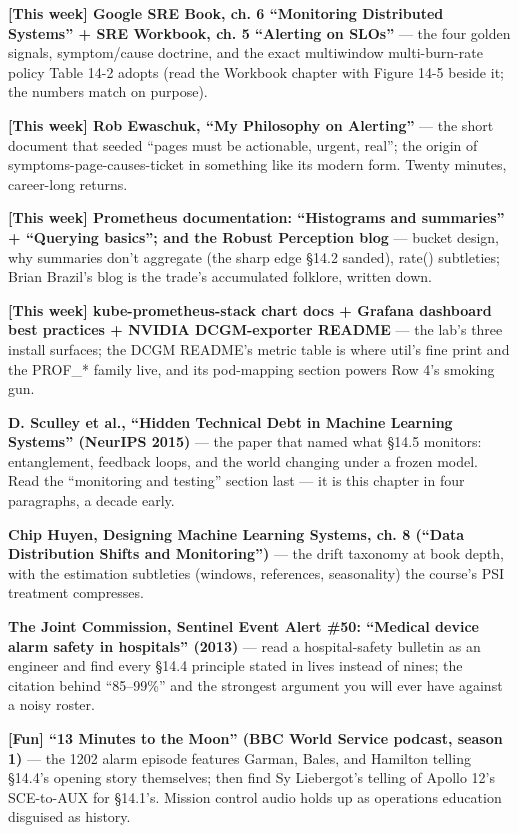 \begin{tbbitemize}
  \item \textbf{[This week] Google SRE Book, ch. 6 “Monitoring Distributed Systems” + SRE Workbook, ch. 5 “Alerting on SLOs”} — the four golden signals, symptom/cause doctrine, and the exact multiwindow multi-burn-rate policy Table 14-2 adopts (read the Workbook chapter with Figure 14-5 beside it; the numbers match on purpose).
  \item \textbf{[This week] Rob Ewaschuk, “My Philosophy on Alerting”} — the short document that seeded “pages must be actionable, urgent, real”; the origin of symptoms-page-causes-ticket in something like its modern form. Twenty minutes, career-long returns.
  \item \textbf{[This week] Prometheus documentation: “Histograms and summaries” + “Querying basics”; and the Robust Perception blog} — bucket design, why summaries don’t aggregate (the sharp edge §14.2 sanded), rate() subtleties; Brian Brazil’s blog is the trade’s accumulated folklore, written down.
  \item \textbf{[This week] kube-prometheus-stack chart docs + Grafana dashboard best practices + NVIDIA DCGM-exporter README} — the lab’s three install surfaces; the DCGM README’s metric table is where util’s fine print and the PROF\_* family live, and its pod-mapping section powers Row 4’s smoking gun.
  \item \textbf{D. Sculley et al., “Hidden Technical Debt in Machine Learning Systems” (NeurIPS 2015)} — the paper that named what §14.5 monitors: entanglement, feedback loops, and the world changing under a frozen model. Read the “monitoring and testing” section last — it is this chapter in four paragraphs, a decade early.
  \item \textbf{Chip Huyen, Designing Machine Learning Systems, ch. 8 (“Data Distribution Shifts and Monitoring”)} — the drift taxonomy at book depth, with the estimation subtleties (windows, references, seasonality) the course’s PSI treatment compresses.
  \item \textbf{The Joint Commission, Sentinel Event Alert \#50: “Medical device alarm safety in hospitals” (2013)} — read a hospital-safety bulletin as an engineer and find every §14.4 principle stated in lives instead of nines; the citation behind “85–99\%” and the strongest argument you will ever have against a noisy roster.
  \item \textbf{[Fun] “13 Minutes to the Moon” (BBC World Service podcast, season 1)} — the 1202 alarm episode features Garman, Bales, and Hamilton telling §14.4’s opening story themselves; then find Sy Liebergot’s telling of Apollo 12’s SCE-to-AUX for §14.1’s. Mission control audio holds up as operations education disguised as history.
\end{tbbitemize}

